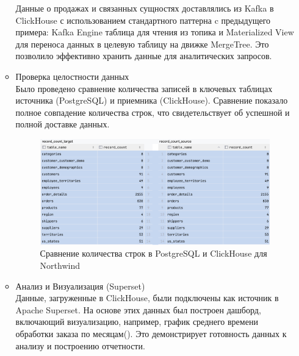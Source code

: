 \begin{enumerate}[1.]
\begin{itemize}
                Данные о продажах и связанных сущностях доставлялись из Kafka в ClickHouse с использованием стандартного паттерна c предыдущего примера: Kafka Engine таблица для чтения из топика и Materialized View для переноса данных в целевую таблицу на движке MergeTree. Это позволило эффективно хранить данные для аналитических запросов.
          \item Проверка целостности данных\\
                Было проведено сравнение количества записей в ключевых таблицах источника (PostgreSQL) и приемника (ClickHouse). Сравнение показало полное совпадение количества строк, что свидетельствует об успешной и полной доставке данных.
                \begin{figure}
                  \center
                  \includegraphics [scale=0.5] {my_folder/images/ex1_tables_ch_pg_compraring}
                  \caption{Сравнение количества строк в PostgreSQL и ClickHouse для Northwind}
                  \label{fig:ex1_tables_ch_pg_compraring}
                \end{figure}
                \FloatBarrier
          \item Анализ и Визуализация (Superset)\\
                Данные, загруженные в ClickHouse, были подключены как источник в Apache Superset. На основе этих данных был построен дашборд, включающий визуализацию, например, график среднего времени обработки заказа по месяцам(). Это демонстрирует готовность данных к анализу и построению отчетности.
                \begin{figure}
                  \center

\end{figure}
\end{itemize}
\end{enumerate}
